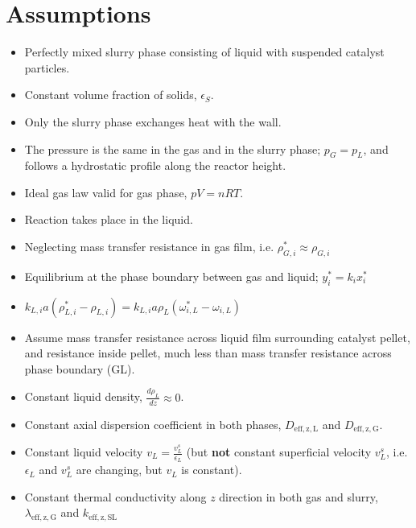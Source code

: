 \documentclass{article}
\begin{document}
\section{Assumptions}
\label{sec:assumptions}
\begin{itemize}
	\item Perfectly mixed slurry phase consisting of liquid with suspended catalyst particles.
	\item Constant volume fraction of solids, $\epsilon_S$.
	\item Only the slurry phase exchanges heat with the wall.
  	\item The pressure is the same in the gas and in the slurry phase; $p_G=p_L$, and follows a hydrostatic profile along the reactor height.
  	\item Ideal gas law valid for gas phase, $pV = nRT$.
  	\item Reaction takes place in the liquid.
  	\item Neglecting mass transfer resistance in gas film, i.e. $\rho_{G,i}^*\approx \rho_{G,i}$
  	\item Equilibrium at the phase boundary between gas and liquid; $y_i^* = k_ix_i ^*$
  	\item $k_{L,i}a(\rho_{L,i}^*-\rho_{L,i}) = k_{L,i}a\rho_L(\omega_{i,L}^*-\omega_{i,L})$
  	\item Assume mass transfer resistance across liquid film surrounding catalyst pellet, and resistance inside pellet, much less than mass transfer resistance across phase boundary (GL). 
  	\item Constant liquid density, $\frac{d \rho_L}{dz} \approx 0$.
  	\item Constant axial dispersion coefficient in both phases, $D_{\mathrm{eff,z,L}}$ and $D_{\mathrm{eff,z,G}}$.
  	\item Constant liquid velocity $v_L=\frac{v_L^s}{\epsilon_L}$ (but \textbf{not} constant superficial velocity $v_L^s$, i.e. $\epsilon_L$ and $v_L^s$ are changing, but $v_L$ is constant).
  	\item Constant thermal conductivity along $z$ direction in both gas and slurry, $\lambda_{\mathrm{eff,z,G}}$ and $k_{\mathrm{eff,z,SL}}$
  \end{itemize}  
\end{document}
